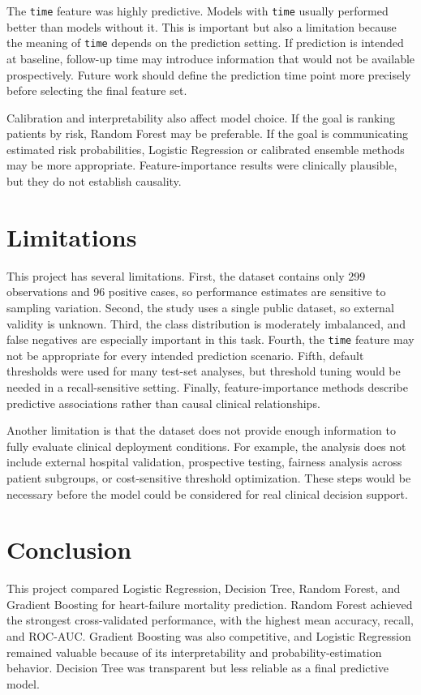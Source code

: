 \documentclass{article}
\begin{document}
The \texttt{time} feature was highly predictive. Models with \texttt{time} usually performed better than models without it. This is important but also a limitation because the meaning of \texttt{time} depends on the prediction setting. If prediction is intended at baseline, follow-up time may introduce information that would not be available prospectively. Future work should define the prediction time point more precisely before selecting the final feature set.

Calibration and interpretability also affect model choice. If the goal is ranking patients by risk, Random Forest may be preferable. If the goal is communicating estimated risk probabilities, Logistic Regression or calibrated ensemble methods may be more appropriate. Feature-importance results were clinically plausible, but they do not establish causality.

\section{Limitations}

This project has several limitations. First, the dataset contains only 299 observations and 96 positive cases, so performance estimates are sensitive to sampling variation. Second, the study uses a single public dataset, so external validity is unknown. Third, the class distribution is moderately imbalanced, and false negatives are especially important in this task. Fourth, the \texttt{time} feature may not be appropriate for every intended prediction scenario. Fifth, default thresholds were used for many test-set analyses, but threshold tuning would be needed in a recall-sensitive setting. Finally, feature-importance methods describe predictive associations rather than causal clinical relationships.

Another limitation is that the dataset does not provide enough information to fully evaluate clinical deployment conditions. For example, the analysis does not include external hospital validation, prospective testing, fairness analysis across patient subgroups, or cost-sensitive threshold optimization. These steps would be necessary before the model could be considered for real clinical decision support.

\section{Conclusion}

This project compared Logistic Regression, Decision Tree, Random Forest, and Gradient Boosting for heart-failure mortality prediction. Random Forest achieved the strongest cross-validated performance, with the highest mean accuracy, recall, and ROC-AUC. Gradient Boosting was also competitive, and Logistic Regression remained valuable because of its interpretability and probability-estimation behavior. Decision Tree was transparent but less reliable as a final predictive model.
\end{document}
